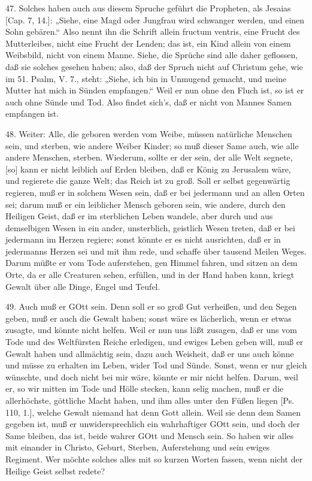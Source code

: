 47. Solches haben auch aus diesem Spruche geführt die Propheten, als Jesaias [Cap. 7, 14.]: „Siehe, eine Magd oder Jungfrau wird schwanger werden, und einen Sohn gebären.“ Also nennt ihn die Schrift allein fructum ventris, eine Frucht des Mutterleibes, nicht eine Frucht der Lenden; das ist, ein Kind allein von einem Weibsbild, nicht von einem Manne. Siehe, die Sprüche sind alle daher geflossen, daß sie solches gesehen haben; also, daß der Spruch nicht auf Christum gehe, wie im 51. Psalm, V. 7., steht: „Siehe, ich bin in Unmugend gemacht, und meine Mutter hat mich in Sünden empfangen.“ Weil er nun ohne den Fluch ist, so ist er auch ohne Sünde und Tod. Also findet sich’s, daß er nicht von Mannes Samen empfangen ist.

48. Weiter: Alle, die geboren werden vom Weibe, müssen natürliche Menschen sein, und sterben, wie andere Weiber Kinder; so muß dieser Same auch, wie alle andere Menschen, sterben. Wiederum, sollte er der sein, der alle Welt segnete, [so] kann er nicht leiblich auf Erden bleiben, daß er König zu Jerusalem wäre, und regierete die ganze Welt; das Reich ist zu groß. Soll er selbst gegenwärtig regieren, muß er in solchem Wesen sein, daß er bei jedermann und an allen Orten sei; darum muß er ein leiblicher Mensch geboren sein, wie andere, durch den Heiligen Geist, daß er im sterblichen Leben wandele, aber durch und aus demselbigen Wesen in ein ander, unsterblich, geistlich Wesen treten, daß er bei jedermann im Herzen regiere; sonst könnte er es nicht ausrichten, daß er in jedermanns Herzen sei und mit ihm rede, und schaffe über tausend Meilen Weges. Darum müßte er vom Tode auferstehen, gen Himmel fahren, und sitzen an dem Orte, da er alle Creaturen sehen, erfüllen, und in der Hand haben kann, kriegt Gewalt über alle Dinge, Engel und Teufel.

49. Auch muß er GOtt sein. Denn soll er so groß Gut verheißen, und den Segen geben, muß er auch die Gewalt haben; sonst wäre es lächerlich, wenn er etwas zusagte, und könnte nicht helfen. Weil er nun uns läßt zusagen, daß er uns vom Tode und des Weltfürsten Reiche erledigen, und ewiges Leben geben will, muß er Gewalt haben und allmächtig sein, dazu auch Weisheit, daß er uns auch könne und müsse zu erhalten im Leben, wider Tod und Sünde. Sonst, wenn er nur gleich wünschte, und doch nicht bei mir wäre, könnte er mir nicht helfen. Darum, weil er, so wir mitten im Tode und Hölle stecken, kann selig machen, muß er die allerhöchste, göttliche Macht haben, und ihm alles unter den Füßen liegen [Ps. 110, 1.], welche Gewalt niemand hat denn Gott allein. Weil sie denn dem Samen gegeben ist, muß er unwidersprechlich ein wahrhaftiger GOtt sein, und doch der Same bleiben, das ist, beide wahrer GOtt und Mensch sein. So haben wir alles mit einander in Christo, Geburt, Sterben, Auferstehung und sein ewiges Regiment. Wer möchte solches alles mit so kurzen Worten fassen, wenn nicht der Heilige Geist selbst redete?

